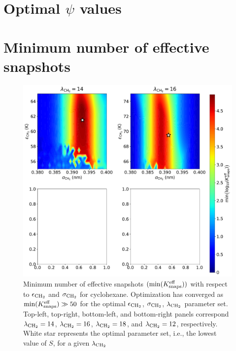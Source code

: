 \documentclass[journal=jctc,manuscript=article]{achemso}
\begin{document}
\section{Optimal $\psi$ values} \label{SI sec: eps scale}

\section{Minimum number of effective snapshots} \label{SI sec: Min eff}

	\begin{figure}[htb!]
		\centering
		\includegraphics[width=6.4in]{CYC6_min_Neff_lam_iteration.pdf}
		\caption{Minimum number of effective snapshots $(\min(K_{\rm snaps}^{\rm eff}))$ with respect to $\epsilon_{\rm CH_2}$ and $\sigma_{\rm CH_2}$ for cyclohexane. Optimization has converged as $\min(K_{\rm snaps}^{\rm eff}) \gg 50$ for the optimal $\epsilon_{\rm CH_2}$, $\sigma_{\rm CH_2}$, $\lambda_{\rm CH_2}$ parameter set. Top-left, top-right, bottom-left, and bottom-right panels correspond $\lambda_{\rm CH_2} = 14$, $\lambda_{\rm CH_2} = 16$, $\lambda_{\rm CH_2} = 18$, and $\lambda_{\rm CH_2} = 12$, respectively. White star represents the optimal parameter set, i.e., the lowest value of $S$, for a given $\lambda_{\rm CH_2}$}
		\label{SI fig:Iterate_Neff_CYC6}
	\end{figure}
\end{document}
